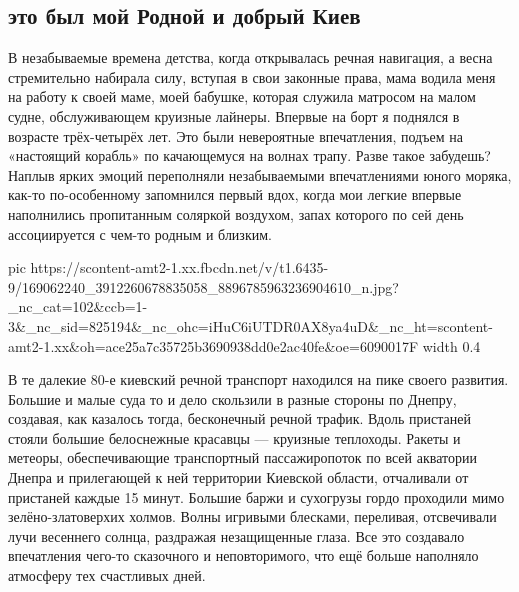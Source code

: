  
 
 
 
 

\subsection{это был мой Родной и добрый Киев}
\label{sec:05_04_2021.fb.smith_helg.1.kiev}

В незабываемые времена детства, когда открывалась речная навигация, а весна
стремительно набирала силу, вступая в свои законные права, мама водила меня на
работу к своей маме, моей бабушке, которая служила матросом на малом судне,
обслуживающем круизные лайнеры. Впервые на борт я поднялся в возрасте
трёх-четырёх лет. Это были невероятные впечатления, подъем на «настоящий
корабль» по качающемуся на волнах трапу. Разве такое забудешь? Наплыв ярких
эмоций переполняли незабываемыми впечатлениями юного моряка, как-то
по-особенному запомнился первый вдох, когда мои легкие впервые наполнились
пропитанным соляркой воздухом, запах которого по сей день ассоциируется с
чем-то родным и близким. 

\ifcmt
  pic https://scontent-amt2-1.xx.fbcdn.net/v/t1.6435-9/169062240_3912260678835058_8896785963236904610_n.jpg?_nc_cat=102&ccb=1-3&_nc_sid=825194&_nc_ohc=iHuC6iUTDR0AX8ya4uD&_nc_ht=scontent-amt2-1.xx&oh=ace25a7c35725b3690938dd0e2ac40fe&oe=6090017F
  width 0.4
\fi

В те далекие 80-е киевский речной транспорт находился на пике своего развития.
Большие и малые суда то и дело скользили в разные стороны по Днепру, создавая,
как казалось тогда, бесконечный речной трафик. Вдоль пристаней стояли большие
белоснежные красавцы — круизные теплоходы. Ракеты и метеоры, обеспечивающие
транспортный пассажиропоток по всей акватории Днепра и прилегающей к ней
территории Киевской области, отчаливали от пристаней каждые 15 минут. Большие
баржи и сухогрузы гордо проходили мимо зелёно-златоверхих холмов. Волны
игривыми блесками, переливая, отсвечивали лучи весеннего солнца, раздражая
незащищенные глаза. Все это создавало впечатления чего-то сказочного и
неповторимого, что ещё больше наполняло атмосферу тех счастливых дней.

